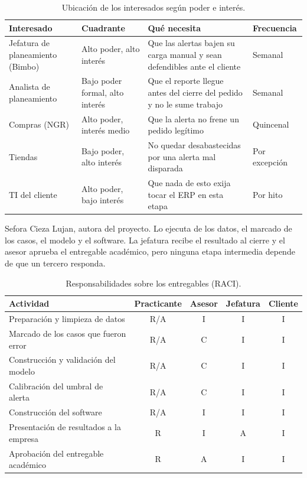 \begin{table}[htbp]
\centering
\caption{Ubicación de los interesados según poder e interés.}
\label{tab:stakeholders}
\small
\begin{tabularx}{\textwidth}{@{}L{3.2cm}L{3.2cm}YL{2cm}@{}}
\toprule
\textbf{Interesado} & \textbf{Cuadrante} & \textbf{Qué necesita} & \textbf{Frecuencia} \\
\midrule
Jefatura de planeamiento (Bimbo) & Alto poder, alto interés & Que las alertas bajen su carga manual y sean defendibles ante el cliente & Semanal \\
Analista de planeamiento & Bajo poder formal, alto interés & Que el reporte llegue antes del cierre del pedido y no le sume trabajo & Semanal \\
Compras (NGR) & Alto poder, interés medio & Que la alerta no frene un pedido legítimo & Quincenal \\
Tiendas & Bajo poder, alto interés & No quedar desabastecidas por una alerta mal disparada & Por excepción \\
TI del cliente & Alto poder, bajo interés & Que nada de esto exija tocar el ERP en esta etapa & Por hito \\
\bottomrule
\end{tabularx}
\end{table}

\textbf{} Sefora Cieza Lujan, autora del proyecto. Lo ejecuta  de los datos, el marcado de los casos, el modelo y el software. La jefatura recibe el resultado al cierre y el asesor aprueba el entregable académico, pero ninguna etapa intermedia depende de que un tercero responda.

\iffinal\else
\begin{table}[htbp]
\centering
\caption{Responsabilidades sobre los entregables (RACI).}
\label{tab:raci}
\small
\begin{tabular}{@{}lcccc@{}}
\toprule
\textbf{Actividad} & \textbf{Practicante} & \textbf{Asesor} & \textbf{Jefatura} & \textbf{Cliente} \\
\midrule
Preparación y limpieza de datos & R/A & I & I & I \\
Marcado de los casos que fueron error & R/A & C & I & I \\
Construcción y validación del modelo & R/A & C & I & I \\
Calibración del umbral de alerta & R/A & C & I & I \\
Construcción del software & R/A & I & I & I \\
Presentación de resultados a la empresa & R & I & A & I \\
Aprobación del entregable académico & R & A & I & I \\
\bottomrule
\end{tabular}
\end{table}
\fi


